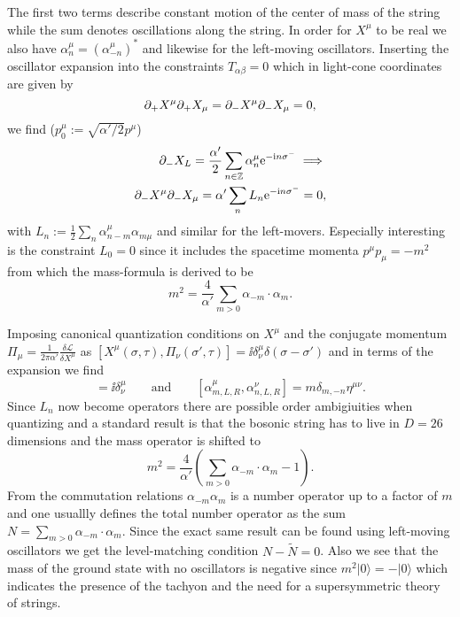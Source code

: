 The first two terms describe constant motion of the center of mass of the string while the sum denotes oscillations along the string. In order for $X^\mu$ to be real we also have $\alpha_{n}^\mu=(\alpha_{-n}^\mu)^*$ and likewise for the left-moving oscillators. Inserting the oscillator expansion into the constraints $T_{\alpha\beta}=0$ which in light-cone coordinates are given by 
\begin{equation}
    \partial_+X^\mu\partial_+X_\mu =\partial_-X^\mu\partial_-X_\mu = 0,
\end{equation}
we find ($p_0^\mu:= \sqrt{\alpha'/2}p^\mu$)
\begin{equation}
    \begin{aligned}
    \partial_-X_L = \frac{\alpha'}{2}\sum_{n\in\mathbb{Z}}\alpha_{n}^\mu \mathrm{e}^{-\mathrm{i} n\sigma^-}\implies\\
    \partial_-X^\mu\partial_-X_\mu = \alpha'\sum_nL_n \mathrm{e}^{-\mathrm{i} n\sigma^-}=0,
    \end{aligned}
\end{equation}
with $L_n:=\frac{1}{2}\sum_n \alpha_{n-m}^\mu\alpha_{m\mu}$ and similar for the left-movers. Especially interesting is the constraint $L_0=0$ since it includes the spacetime momenta $p^\mu p_\mu=-m^2$ from which the mass-formula is derived to be
\begin{equation}
    m^2 = \frac{4}{\alpha'}\sum_{m>0}\alpha_{-m}\cdot \alpha_{m}.
\end{equation}

Imposing canonical quantization conditions on $X^\mu$ and the conjugate momentum $\Pi_\mu=\frac{1}{2\pi\alpha'}\frac{\delta \mathcal{L}}{\delta X^\mu}$ as $[X^\mu(\sigma,\tau),\Pi_\nu(\sigma',\tau)] = \ii \delta^\mu_\nu\delta(\sigma-\sigma')$ and in terms of the expansion we find 
\begin{equation}
    [x^\mu,p_\nu] = \ii \delta^\mu_\nu \qquad \text{and}\qquad [\alpha^\mu_{m,L,R},\alpha^\nu_{n,L,R}] = m\delta_{m,-n}\eta^{\mu\nu}.
\end{equation}
Since $L_n$ now become operators there are possible order ambigiuities when quantizing and a standard result is that the bosonic string has to live in $D=26$ dimensions and the mass operator is shifted to 
\begin{equation}
    m^2 = \frac{4}{\alpha'}\left(\sum_{m>0}\alpha_{-m}\cdot \alpha_{m}-1\right).
\end{equation}
From the commutation relations $\alpha_{-m}\alpha_{m}$ is a number operator up to a factor of $m$ and one usuallly defines the total number operator as the sum $N=\sum_{m>0}\alpha_{-m}\cdot \alpha_{m}$. Since the exact same result can be found using left-moving oscillators we get the level-matching condition $N-\tilde{N}=0$.  Also we see that the mass of the ground state with no oscillators is negative since $m^2|0\rangle=-|0\rangle$ which indicates the presence of the tachyon and the need for a supersymmetric theory of strings. 

